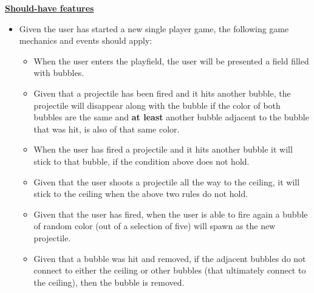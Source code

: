 \documentclass[a4paper,11pt]{article}
\begin{document}
\textbf{\underline{Should-have features}}
\begin{itemize}
\item Given the user has started a new single player game, the following game mechanics and events should apply:
  \begin{itemize}
    \item When the user enters the playfield, the user will be presented a field filled with bubbles.
    \item Given that a projectile has been fired and it hits another bubble, the projectile will disappear along with the bubble if the color of both bubbles are the same and \textbf{at least} another bubble adjacent to the bubble that was hit, is also of that same color.
    \item When the user has fired a projectile and it hits another bubble it will stick to that bubble, if the condition above does not hold.
    \item Given that the user shoots a projectile all the way to the ceiling, it will stick to the ceiling when the above two rules do not hold.
    \item Given that the user has fired, when the user is able to fire again a bubble of random color (out of a selection of five) will spawn as the new projectile.
    \item Given that a bubble was hit and removed, if the adjacent bubbles do not connect to either the ceiling or other bubbles (that ultimately connect to the ceiling), then the bubble is removed. \\
  \end{itemize}
\end{itemize}
\end{document}
